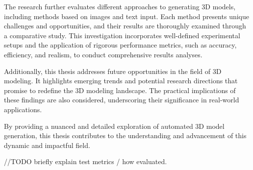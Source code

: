 The research further evaluates different approaches to generating 3D models, including methods based on images and text input. Each method presents unique challenges and opportunities, and their results are thoroughly examined through a comparative study. This investigation incorporates well-defined experimental setups and the application of rigorous performance metrics, such as accuracy, efficiency, and realism, to conduct comprehensive results analyses.

Additionally, this thesis addresses future opportunities in the field of 3D modeling. It highlights emerging trends and potential research directions that promise to redefine the 3D modeling landscape. The practical implications of these findings are also considered, underscoring their significance in real-world applications.

By providing a nuanced and detailed exploration of automated 3D model generation, this thesis contributes to the understanding and advancement of this dynamic and impactful field.

//TODO briefly explain test metrics / how evaluated.